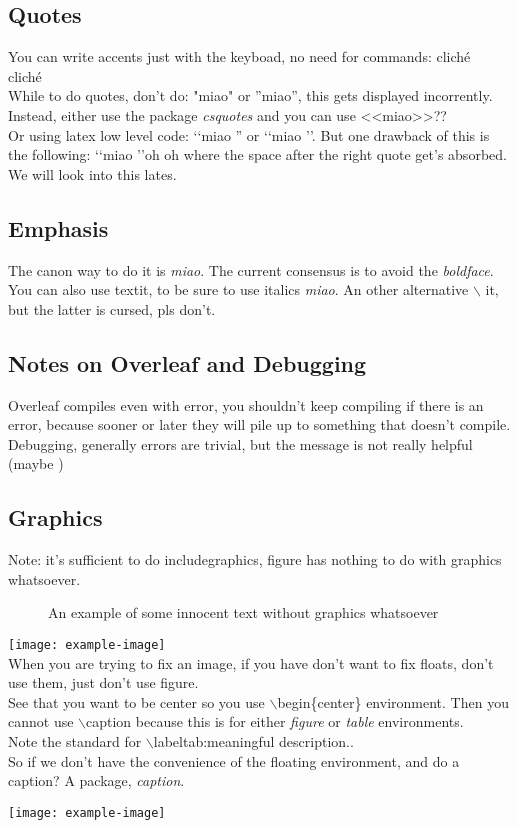 \documentclass[]{article}
\begin{document}
\subsection{Quotes}
You can write accents just with the keyboad, no need for commands:
cliché \\
clich\'e \\
While to do quotes, don't do: "miao" or ''miao'', this gets displayed incorrently.
Instead, either use the package \emph{csquotes} and you can use <<miao>>?? \\ 
Or using latex low level code: \lq\lq miao '' or \lq\lq miao \rq \rq. But one drawback of this is the following: \lq\lq miao \rq \rq oh oh where the space after the right quote get's absorbed. We will look into this lates.
\subsection{Emphasis}
    The canon way to do it is \emph{miao}. The current consensus is to avoid the \emph{boldface}.
    You can also use textit, to be sure to use italics \textit{miao}. An other alternative \(\backslash\) it, but the latter is cursed, pls don't.
    
\subsection{Notes on Overleaf and Debugging}
    Overleaf compiles even with error, you shouldn't keep compiling if there is an error, because sooner or later they will pile up to something that doesn't compile.
    \\ Debugging, generally errors are trivial, but the message is not really helpful (maybe )

\subsection{Graphics}
Note: it's sufficient to do includegraphics, figure has nothing to do with graphics whatsoever. \\
\begin{figure}
    An example of some innocent text without graphics whatsoever
\end{figure}
\texttt{[image: example-image]}
\\ When you are trying to fix an image, if you have don't want to fix floats, don't use them, just don't use figure.
\\ See that you want to be center so you use \(\backslash\)begin\{center\} environment. Then you cannot use \(\backslash\)caption{} because this is for either \emph{figure} or \emph{table} environments.
\\ Note the standard for \(\backslash\)label{tab:meaningful description.}.
\\ So if we don't have the convenience of the floating environment, and do a caption? A package, \emph{caption}.\\ 
\begin{center}
    \texttt{[image: example-image]}
    \label{img:ahah}
\end{center}
\end{document}
